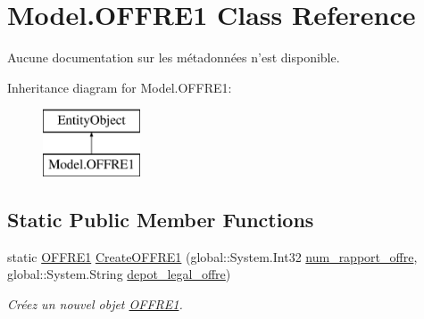 \hypertarget{class_model_1_1_o_f_f_r_e1}{\section{Model.\-O\-F\-F\-R\-E1 Class Reference}
\label{class_model_1_1_o_f_f_r_e1}
}


Aucune documentation sur les métadonnées n'est disponible.  


Inheritance diagram for Model.\-O\-F\-F\-R\-E1\-:\begin{figure}[H]
\begin{center}
\leavevmode
\includegraphics[height=2.000000cm]{class_model_1_1_o_f_f_r_e1}
\end{center}
\end{figure}
\subsection*{Static Public Member Functions}
\begin{DoxyCompactItemize}
\item 
static \hyperlink{class_model_1_1_o_f_f_r_e1}{O\-F\-F\-R\-E1} \hyperlink{class_model_1_1_o_f_f_r_e1_abb497ef2ec37783628503914a0b03e36}{Create\-O\-F\-F\-R\-E1} (global\-::\-System.\-Int32 \hyperlink{class_model_1_1_o_f_f_r_e1_ad57c3bdb1734c2de219aaf5267da7a33}{num\-\_\-rapport\-\_\-offre}, global\-::\-System.\-String \hyperlink{class_model_1_1_o_f_f_r_e1_abd3803160cf8cdb50d1d357bf379d82b}{depot\-\_\-legal\-\_\-offre})
\begin{DoxyCompactList}\small\item\em Créez un nouvel objet \hyperlink{class_model_1_1_o_f_f_r_e1}{O\-F\-F\-R\-E1}. \end{DoxyCompactList}\end{DoxyCompactItemize}
